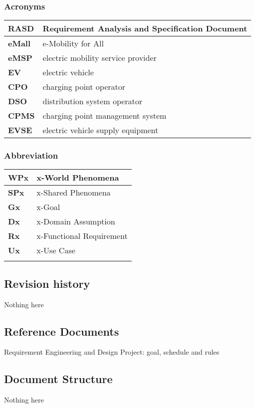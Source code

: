 \subsubsection*{Acronyms}
\begin{table}[h]
    \begin{tabular}{|l|l|}
        \toprule
        \textbf{RASD}  & Requirement Analysis and Specification Document \\ \midrule
        \textbf{eMall} & e-Mobility for All                              \\ \midrule
        \textbf{eMSP}  & electric mobility service provider              \\ \midrule
        \textbf{EV}    & electric vehicle                                \\ \midrule
        \textbf{CPO}   & charging point operator                         \\ \midrule
        \textbf{DSO}   & distribution system operator                    \\ \midrule
        \textbf{CPMS}  & charging point management system                \\ \midrule
        \textbf{EVSE}  & electric vehicle supply equipment               \\ \bottomrule
    \end{tabular}
\end{table}
\subsubsection*{Abbreviation}
\begin{table}[h]
    \begin{tabular}{|l|l|}
        \toprule
        \textbf{WPx} & x-World Phenomena        \\ \midrule
        \textbf{SPx} & x-Shared Phenomena       \\ \midrule
        \textbf{Gx}  & x-Goal                   \\ \midrule
        \textbf{Dx}  & x-Domain Assumption      \\ \midrule
        \textbf{Rx}  & x-Functional Requirement \\ \midrule
        \textbf{Ux}  & x-Use Case               \\ \midrule
                     &                          \\ \bottomrule
    \end{tabular}
\end{table}
\subsection{Revision history}
Nothing here

\subsection{Reference Documents}
Requirement Engineering and Design Project: goal, schedule and rules


\subsection{Document Structure}
Nothing here
